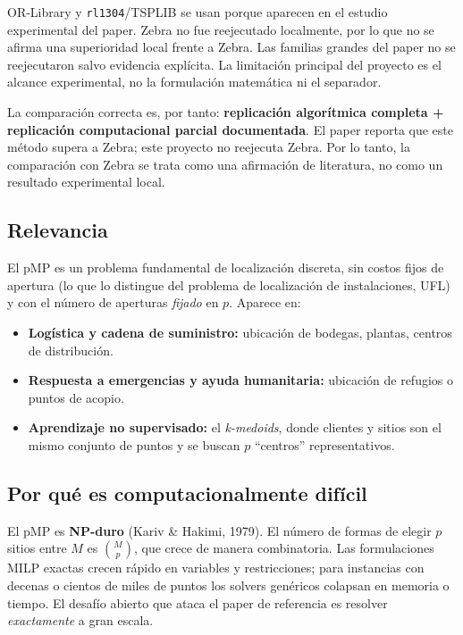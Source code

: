 OR-Library y \texttt{rl1304}/TSPLIB se usan porque aparecen en el estudio experimental del paper.
Zebra no fue reejecutado localmente, por lo que no se afirma una superioridad local frente a
Zebra. Las familias grandes del paper no se reejecutaron salvo evidencia explícita. La limitación
principal del proyecto es el alcance experimental, no la formulación matemática ni el separador.

La comparación correcta es, por tanto: \textbf{replicación algorítmica completa + replicación
computacional parcial documentada}. El paper reporta que este método supera a Zebra; este
proyecto no reejecuta Zebra. Por lo tanto, la comparación con Zebra se trata como una afirmación
de literatura, no como un resultado experimental local.

\subsection{Relevancia}
El pMP es un problema fundamental de localización discreta, sin costos fijos de apertura (lo que
lo distingue del problema de localización de instalaciones, UFL) y con el número de aperturas
\emph{fijado} en $p$. Aparece en:
\begin{itemize}[noitemsep]
  \item \textbf{Logística y cadena de suministro:} ubicación de bodegas, plantas, centros de distribución.
  \item \textbf{Respuesta a emergencias y ayuda humanitaria:} ubicación de refugios o puntos de acopio.
  \item \textbf{Aprendizaje no supervisado:} el \textit{k-medoids}, donde clientes y sitios son el
        mismo conjunto de puntos y se buscan $p$ ``centros'' representativos.
\end{itemize}

\subsection{Por qué es computacionalmente difícil}
El pMP es \textbf{NP-duro} (Kariv \& Hakimi, 1979). El número de formas de elegir $p$ sitios entre
$M$ es $\binom{M}{p}$, que crece de manera combinatoria. Las formulaciones MILP exactas crecen
rápido en variables y restricciones; para instancias con decenas o cientos de miles de puntos los
solvers genéricos colapsan en memoria o tiempo. El desafío abierto que ataca el paper de
referencia es resolver \emph{exactamente} a gran escala.

